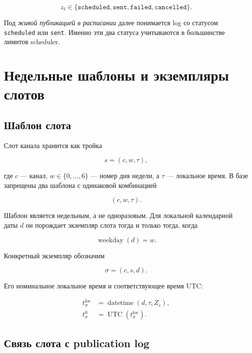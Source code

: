\documentclass[12pt,a4paper]{article}
\newcommand{\Status}[1]{\texttt{#1}}
\begin{document}
\begin{equation}
  z_\ell\in
  \{\Status{scheduled},\Status{sent},\Status{failed},\Status{cancelled}\}.
\end{equation}

Под \emph{живой публикацией в расписании} далее понимается log со статусом
\Status{scheduled} или \Status{sent}. Именно эти два статуса учитываются в
большинстве лимитов scheduler.

\section{Недельные шаблоны и экземпляры слотов}

\subsection{Шаблон слота}

Слот канала хранится как тройка

\begin{equation}
  s=(c,w,\tau),
\end{equation}

где $c$ --- канал, $w\in\{0,\ldots,6\}$ --- номер дня недели, а $\tau$ ---
локальное время. В базе запрещены два шаблона с одинаковой комбинацией

\begin{equation}
  (c,w,\tau).
\end{equation}

Шаблон является недельным, а не одноразовым. Для локальной календарной даты
$d$ он порождает экземпляр слота тогда и только тогда, когда

\begin{equation}
  \operatorname{weekday}(d)=w.
\end{equation}

Конкретный экземпляр обозначим

\begin{equation}
  \sigma=(c,s,d).
\end{equation}

Его номинальное локальное время и соответствующее время UTC:

\begin{align}
  t^{\mathrm{loc}}_\sigma
    &=\operatorname{datetime}(d,\tau,Z_c),\\
  t^0_\sigma
    &=\operatorname{UTC}\!\left(t^{\mathrm{loc}}_\sigma\right).
\end{align}

\subsection{Связь слота с publication log}
\end{document}
